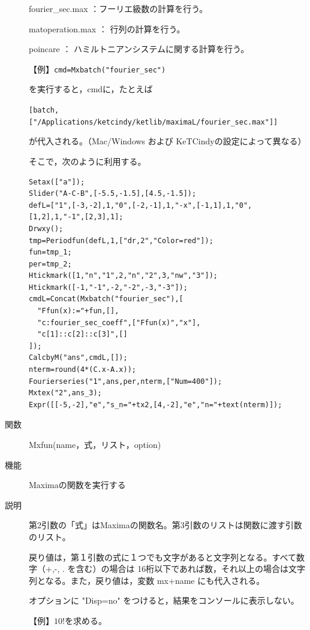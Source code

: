 \documentclass[papersize,a4paper,12pt,uplatex]{jsarticle}
\begin{document}
\begin{description}
fourier\_sec.max ：フーリエ級数の計算を行う。

matoperation.max ： 行列の計算を行う。

poincare ： ハミルトニアンシステムに関する計算を行う。


\vspace{\baselineskip}
【例】\verb|cmd=Mxbatch("fourier_sec")|

を実行すると，cmdに，たとえば

\verb|[batch,["/Applications/ketcindy/ketlib/maximaL/fourier_sec.max"]] |

が代入される。（Mac/Windows および KeTCindyの設定によって異なる）

そこで，次のように利用する。

\begin{verbatim}
Setax(["a"]); 
Slider("A-C-B",[-5.5,-1.5],[4.5,-1.5]);
defL=["1",[-3,-2],1,"0",[-2,-1],1,"-x",[-1,1],1,"0",[1,2],1,"-1",[2,3],1];
Drwxy();
tmp=Periodfun(defL,1,["dr,2","Color=red"]);
fun=tmp_1;
per=tmp_2;
Htickmark([1,"n","1",2,"n","2",3,"nw","3"]);
Htickmark([-1,"-1",-2,"-2",-3,"-3"]);
cmdL=Concat(Mxbatch("fourier_sec"),[
  "Ffun(x):="+fun,[],
  "c:fourier_sec_coeff",["Ffun(x)","x"],
  "c[1]::c[2]::c[3]",[]
]);
CalcbyM("ans",cmdL,[]);
nterm=round(4*(C.x-A.x));
Fourierseries("1",ans,per,nterm,["Num=400"]);
Mxtex("2",ans_3);
Expr([[-5,-2],"e","s_n="+tx2,[4,-2],"e","n="+text(nterm)]);
\end{verbatim}

\hspace{10mm}


\vspace{15mm}
\hypertarget{mxfun}{}
\item[関数]Mxfun(name，式，リスト，option)
\item[機能]Maximaの関数を実行する
\item[説明]第2引数の「式」はMaximaの関数名。第3引数のリストは関数に渡す引数のリスト。

戻り値は，第１引数の式に１つでも文字があると文字列となる。すべて数字（+,-, . を含む）の場合は
16桁以下であれば数，それ以上の場合は文字列となる。また，戻り値は，変数 mx+name にも代入される。

オプションに "Disp=no" をつけると，結果をコンソールに表示しない。

\vspace{\baselineskip}
【例】$10!$を求める。


\end{description}
\end{document}
